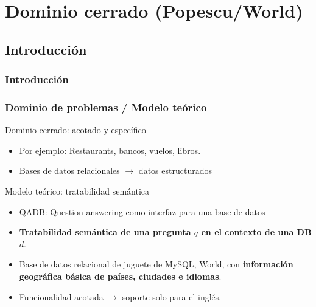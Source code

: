\fontsize{9.5pt}{8.2}\selectfont
\section{Dominio cerrado (Popescu/World)}
\subsection{Introducción}

\frametitle{Introducción}
\begin{frame}[<+->]
  \frametitle{Dominio de problemas / Modelo teórico}
   \begin{block}{Dominio cerrado: acotado y específico}
      \begin{itemize}
          \item Por ejemplo: Restaurants, bancos, vuelos, libros.
          \item Bases de datos relacionales $\rightarrow$ datos estructurados
      \end{itemize}
    \end{block}

  \begin{block}{Modelo teórico: tratabilidad semántica}
    \begin{itemize}
          \item QADB: Question answering como interfaz para una base de datos
          \item \textbf{Tratabilidad semántica de una pregunta $q$ en el contexto de una DB $d$}.
          \item Base de datos relacional de juguete de MySQL, World, con \textbf{información geográfica básica de países, ciudades e idiomas}.
          \item Funcionalidad acotada  $\rightarrow$ soporte solo para el inglés.
    \end{itemize}
  \end{block}
\end{frame}


